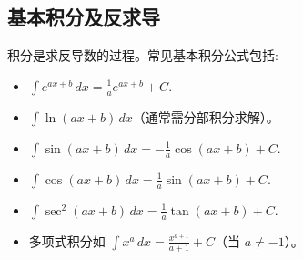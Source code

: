 \documentclass[8pt,a4paper,twoside]{tau-class/tau}
\begin{document}
\subsection{基本积分及反求导}
积分是求反导数的过程。常见基本积分公式包括:
\begin{itemize}
    \item \(\displaystyle \int e^{ax+b}\,dx = \frac{1}{a}e^{ax+b} + C.\)
    \item \(\displaystyle \int \ln(ax+b)\,dx\)（通常需分部积分求解）。
    \item \(\displaystyle \int \sin(ax+b)\,dx = −\frac{1}{a}\cos(ax+b) + C.\)
    \item \(\displaystyle \int \cos(ax+b)\,dx = \frac{1}{a}\sin(ax+b) + C.\)
    \item \(\displaystyle \int \sec^2(ax+b)\,dx = \frac{1}{a}\tan(ax+b) + C.\)
    \item 多项式积分如 \(\displaystyle \int x^a\,dx = \frac{x^{a+1}}{a+1} + C\)（当 \(a\neq −1\)）。
\end{itemize}
\end{document}
